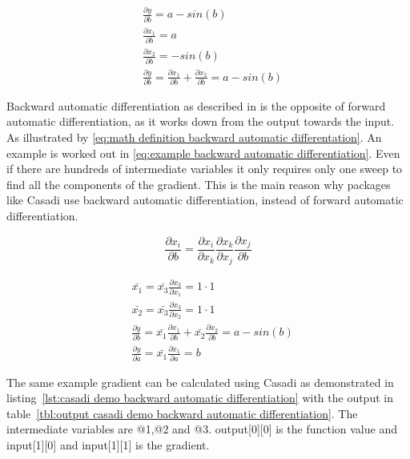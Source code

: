 \begin{equation}
	\begin{aligned}
		& \frac{\partial y}{\partial b} = a - sin(b) \\
		& \frac{\partial x_1}{\partial b} = a  \\
		& \frac{\partial x_2}{\partial b} = -sin(b) \\
		& \frac{\partial y}{\partial b} = \frac{\partial x_1}{\partial b} + \frac{\partial x_2}{\partial b}	 = a - sin(b)
	\end{aligned}
	\label{eq:example forward automatic differentiation}
\end{equation}

Backward automatic differentiation as described in\cite{Dhiel} is the opposite of forward automatic differentiation, as it works down from the output towards the input. As illustrated by \eqref{eq:math definition backward automatic differentation}. An example is worked out in \eqref{eq:example backward automatic differentiation}. Even if there are hundreds of intermediate variables it only requires only one sweep to find all the components of the gradient. This is the main reason why packages like Casadi use backward automatic differentiation, instead of forward automatic differentiation.

\begin{equation}
	\frac{\partial x_i}{\partial b} = \frac{\partial x_i}{\partial x_k}\frac{\partial x_k}{\partial x_j}\frac{\partial x_j}{\partial b}
	\label{eq:math definition backward automatic differentation}
\end{equation}

\begin{equation}
\begin{aligned}
& \bar{x_1} = \bar{x_3} \frac{\partial x_3}{\partial x_1} = 1 \cdot 1 \\
& \bar{x_2} = \bar{x_3} \frac{\partial x_3}{\partial x_2} = 1 \cdot 1 \\
& \frac{\partial y}{\partial b} = \bar{x_1} \frac{\partial x_1}{\partial b} + \bar{x_2} \frac{\partial x_2}{\partial b} = a - sin(b)\\
& \frac{\partial y}{\partial a} = \bar{x_1} \frac{\partial x_1}{\partial a} = b
\end{aligned}
\label{eq:example backward automatic differentiation}
\end{equation}

The same example gradient can be calculated using Casadi as demonstrated in listing~\ref{lst:casadi demo backward automatic differentiation} with the output in table~\ref{tbl:output casadi demo backward automatic differentiation}. The intermediate variables are @1,@2 and @3. output[0][0] is the function value and input[1][0] and input[1][1] is the gradient. 

